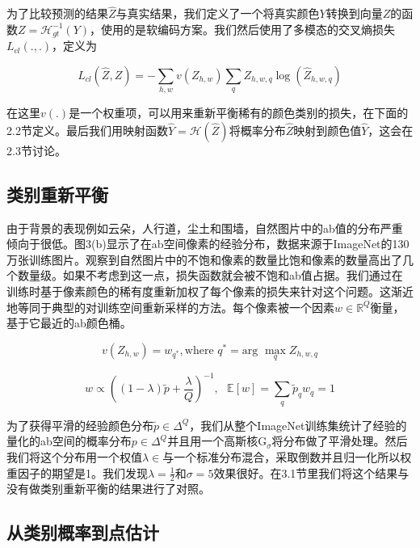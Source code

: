 为了比较预测的结果$\hat{Z}$与真实结果，我们定义了一个将真实颜色$Y$转换到向量$Z$的函数$Z = \mathcal{H}^{-1}_{gt}(Y)$，使用的是软编码方案。我们然后使用了多模态的交叉熵损失$L_{cl}(.,.)$，定义为

\begin{equation}\tag*{(2)}
L_{cl}(\hat{Z}, Z) = -\sum_{h,w}v(Z_{h,w})\sum_{q}Z_{h,w,q} \log(\hat{Z}_{h,w,q})
\end{equation}

在这里$v(.)$是一个权重项，可以用来重新平衡稀有的颜色类别的损失，在下面的2.2节定义。最后我们用映射函数$\hat{Y}=\mathcal{H}(\hat{Z})$将概率分布$\hat{Z}$映射到颜色值$\hat{Y}$，这会在2.3节讨论。

\subsection{类别重新平衡}

由于背景的表现例如云朵，人行道，尘土和围墙，自然图片中的ab值的分布严重倾向于很低。图3(b)显示了在ab空间像素的经验分布，数据来源于ImageNet的130万张训练图片。观察到自然图片中的不饱和像素的数量比饱和像素的数量高出了几个数量级。如果不考虑到这一点，损失函数就会被不饱和ab值占据。我们通过在训练时基于像素颜色的稀有度重新加权了每个像素的损失来针对这个问题。这渐近地等同于典型的对训练空间重新采样的方法。每个像素被一个因素$w \in \mathbb{R}^Q$衡量，基于它最近的ab颜色桶。

\begin{equation}\tag*{(3)}
v(Z_{h,w}) = w_{q^*}, \text{where } q^* = \text{arg } \max\limits_{q} Z_{h,w,q}
\end{equation}

\begin{equation}\tag*{(4)}
w \propto ((1-\lambda)\tilde{p}+\frac{\lambda}{Q})^{-1},\text{ } \mathbb{E}[w] = \sum_{q}\tilde{p}_{q}w_q = 1
\end{equation}

为了获得平滑的经验颜色分布$\tilde{p} \in \Delta^Q$，我们从整个ImageNet训练集统计了经验的量化的ab空间的概率分布$p \in \Delta^Q$并且用一个高斯核$\text{G}_{\sigma}$将分布做了平滑处理。然后我们将这个分布用一个权值$\lambda \in $与一个标准分布混合，采取倒数并且归一化所以权重因子的期望是1。我们发现$\lambda = \frac{1}{2}$和$\sigma = 5$效果很好。在3.1节里我们将这个结果与没有做类别重新平衡的结果进行了对照。

\subsection{从类别概率到点估计}


